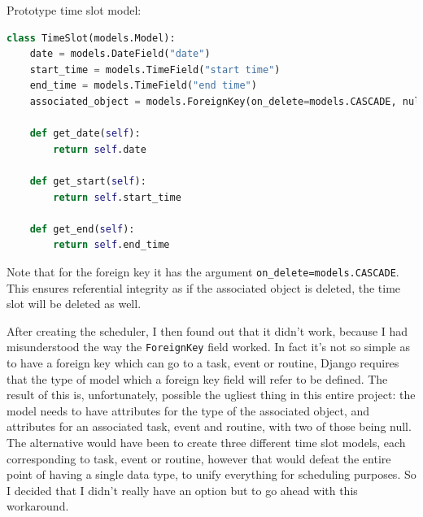\documentclass{article}
\begin{document}
Prototype time slot model:
\begin{lstlisting}[language=Python]
class TimeSlot(models.Model):
    date = models.DateField("date")
    start_time = models.TimeField("start time")
    end_time = models.TimeField("end time")
    associated_object = models.ForeignKey(on_delete=models.CASCADE, null=True)

    def get_date(self):
        return self.date

    def get_start(self):
        return self.start_time

    def get_end(self):
        return self.end_time
\end{lstlisting}

Note that for the foreign key it has the argument \texttt{on\_delete=models.CASCADE}.
This ensures referential integrity as if the associated object is deleted,
the time slot will be deleted as well.

After creating the scheduler,
I then found out that it didn't work,
because I had misunderstood the way the \texttt{ForeignKey} field worked.
In fact it's not so simple as to have a foreign key which can go to a task, event or routine,
Django requires that the type of model which a foreign key field will refer to be defined.
The result of this is,
unfortunately,
possible the ugliest thing in this entire project:
the model needs to have attributes for the type of the associated object,
and attributes for an associated task, event and routine,
with two of those being null.
The alternative would have been to create three different time slot models,
each corresponding to task, event or routine,
however that would defeat the entire point of having a single data type,
to unify everything for scheduling purposes.
So I decided that I didn't really have an option but to go ahead with this workaround.
\end{document}
